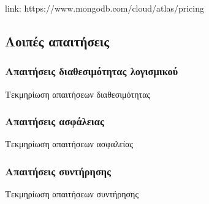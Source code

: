 link: https://www.mongodb.com/cloud/atlas/pricing

\subsection{Λοιπές απαιτήσεις}
\subsubsection{Απαιτήσεις διαθεσιμότητας λογισμικού}
Τεκμηρίωση απαιτήσεων διαθεσιμότητας
\subsubsection{Απαιτήσεις ασφάλειας}
Τεκμηρίωση απαιτήσεων ασφαλείας
\subsubsection{Απαιτήσεις συντήρησης}
Τεκμηρίωση απαιτήσεων συντήρησης